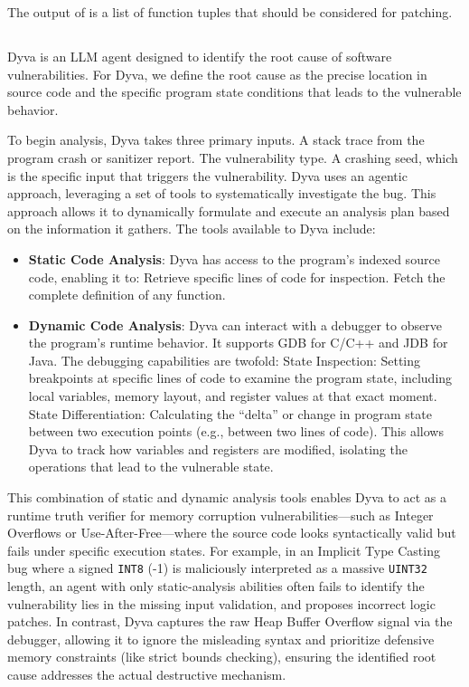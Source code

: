 The output of \kumushi{} is a list of function tuples that should be considered for patching.

\subsection{\dyva}
Dyva is an LLM agent designed to identify the root cause of software vulnerabilities.
For Dyva, we define the root cause as the precise location in source code and the specific program state conditions that leads to the vulnerable behavior.

To begin analysis, Dyva takes three primary inputs.  A stack trace from the program crash or sanitizer report.
 The vulnerability type.
 A crashing seed, which is the specific input that triggers the vulnerability.
Dyva uses an agentic approach, leveraging a set of tools to systematically investigate the bug.
This approach allows it to dynamically formulate and execute an analysis plan based on the information it gathers.
The tools available to Dyva include:
\begin{itemize}
    \item \textbf{Static Code Analysis}: Dyva has access to the program's indexed source code, enabling it to:  Retrieve specific lines of code for inspection. 
    Fetch the complete definition of any function.
    \item \textbf{Dynamic Code Analysis}: Dyva can interact with a debugger to observe the program's runtime behavior. It supports GDB for C/C++ and JDB for Java. The debugging capabilities are twofold:  State Inspection: Setting breakpoints at specific lines of code to examine the program state, including local variables, memory layout, and register values at that exact moment.  State Differentiation: Calculating the ``delta'' or change in program state between two execution points (e.g., between two lines of code). This allows Dyva to track how variables and registers are modified, isolating the operations that lead to the vulnerable state.
\end{itemize}

This combination of static and dynamic analysis tools enables Dyva to act as a runtime truth verifier for memory corruption vulnerabilities---such as Integer Overflows or Use-After-Free---where the source code looks syntactically valid but fails  under specific execution states.
For example, in an Implicit Type Casting bug where a signed \texttt{INT8} (-1) is maliciously interpreted as a massive \texttt{UINT32} length, an agent with only static-analysis abilities often fails to identify the vulnerability lies in the missing input validation, and proposes incorrect logic patches.
In contrast, Dyva captures the raw Heap Buffer Overflow signal via the debugger, allowing it to ignore the misleading syntax and prioritize defensive memory constraints (like strict bounds checking), ensuring the identified root cause addresses the actual destructive mechanism.


